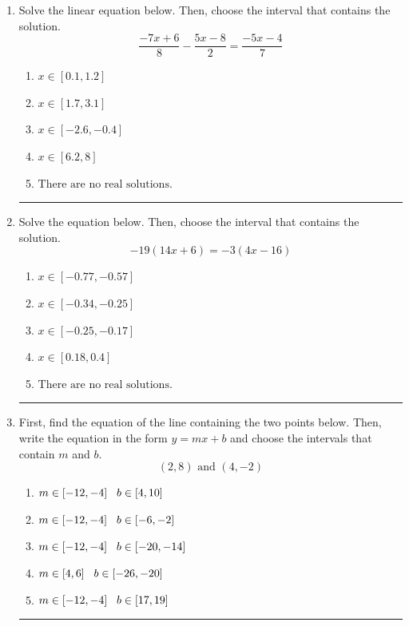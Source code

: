 \documentclass[14pt]{extbook}
\newcommand{\litem}[1]{\item#1\hspace*{-1cm}\rule{\textwidth}{0.4pt}}
\begin{document}
\begin{enumerate}
\litem{
Solve the linear equation below. Then, choose the interval that contains the solution.\[ \frac{-7x + 6}{8} - \frac{5x -8}{2} = \frac{-5x -4}{7} \]\begin{enumerate}[label=\Alph*.]
\item \( x \in [0.1, 1.2] \)
\item \( x \in [1.7, 3.1] \)
\item \( x \in [-2.6, -0.4] \)
\item \( x \in [6.2, 8] \)
\item \( \text{There are no real solutions.} \)

\end{enumerate} }
\litem{
Solve the equation below. Then, choose the interval that contains the solution.\[ -19(14x + 6) = -3(4x -16) \]\begin{enumerate}[label=\Alph*.]
\item \( x \in [-0.77, -0.57] \)
\item \( x \in [-0.34, -0.25] \)
\item \( x \in [-0.25, -0.17] \)
\item \( x \in [0.18, 0.4] \)
\item \( \text{There are no real solutions.} \)

\end{enumerate} }
\litem{
First, find the equation of the line containing the two points below. Then, write the equation in the form $ y=mx+b $ and choose the intervals that contain $m$ and $b$.\[ (2, 8) \text{ and } (4, -2) \]\begin{enumerate}[label=\Alph*.]
\item \( m \in [-12, -4] \hspace*{3mm} b \in [4, 10] \)
\item \( m \in [-12, -4] \hspace*{3mm} b \in [-6, -2] \)
\item \( m \in [-12, -4] \hspace*{3mm} b \in [-20, -14] \)
\item \( m \in [4, 6] \hspace*{3mm} b \in [-26, -20] \)
\item \( m \in [-12, -4] \hspace*{3mm} b \in [17, 19] \)


\end{enumerate}}
\end{enumerate}
\end{document}

